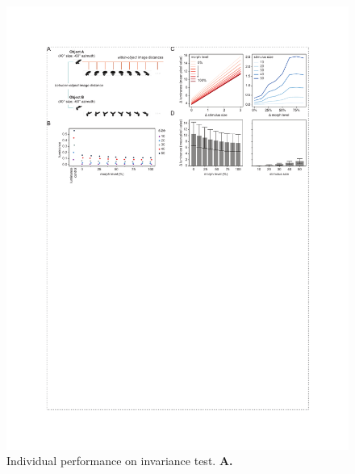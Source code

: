\begin{figure}[t!]
\includegraphics[width=\textwidth]{figures/supplemental/fig_s4_stimulus_metrics/fig_s4_stimulus_metrics.pdf}
    \vspace{.1in}
    \caption[Individual invariance performance]{Individual performance on invariance test.
    \textbf{A.} 
    \label{supfig:stimulus_metrics}}
\end{figure}




